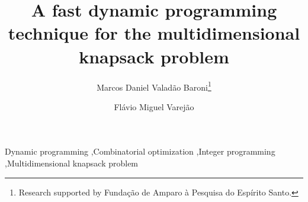 \documentclass[preprint,12pt]{elsarticle}
\begin{document}
\begin{frontmatter}




\title{A fast dynamic programming technique for the multidimensional knapsack problem}



\address{Universidade Federal do Esp\'irito Santo,\\
Av. Fernando Ferrari, 514, Goiabeiras, Vit\'oria, ES, Brazil\\
}


\author{
   Marcos Daniel Valad\~ao Baroni\thanks{Research supported by Funda\c c\~ao de Amparo \`a Pesquisa do Esp\'irito Santo.}
   \and
   Fl\'avio Miguel Varej\~ao
}


\address{}

\begin{abstract}

\end{abstract}

\begin{keyword}
Dynamic programming \sep Combinatorial optimization \sep Integer programming
\sep Multidimensional knapsack problem



\end{keyword}

\end{frontmatter}

%

%

\end{document}
